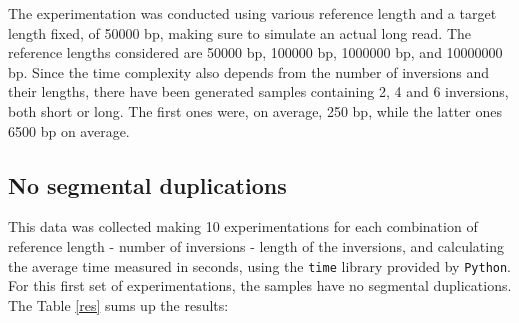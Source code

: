 The experimentation was conducted using various reference length and a target length fixed, of 50000 bp, making sure to simulate an actual long read. The reference lengths considered are 50000 bp, 100000 bp, 1000000 bp, and 10000000 bp. Since the time complexity also depends from the number of inversions and their lengths, there have been generated samples containing 2, 4 and 6 inversions, both short or long. The first ones were, on average, 250 bp, while the latter ones 6500 bp on average. \\

\subsection{No segmental duplications}
This data was collected making 10 experimentations for each combination of reference length - number of inversions - length of the inversions, and calculating the average time measured in seconds, using the \texttt{time} library provided by \texttt{Python}. For this first set of experimentations, the samples have no segmental duplications. The Table \ref{res} sums up the results:

\renewcommand{\arraystretch}{1.2} 

 \begin{table}[h!]
\centering
{}
\caption{Execution times for various reference lengths and target lengths with different numbers of short and long inversions.}
\label{res}
\end{table}

